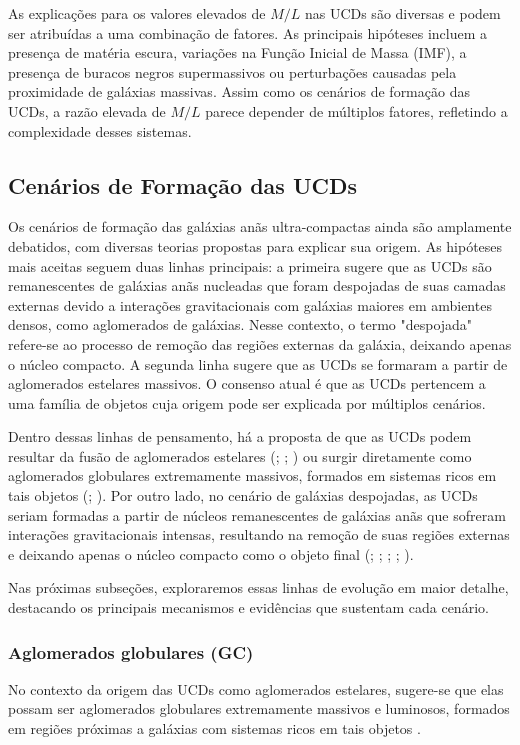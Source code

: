 As explicações para os valores elevados de $M/L$ nas UCDs são diversas e podem ser atribuídas a uma combinação de fatores. As principais hipóteses incluem a presença de matéria escura, variações na Função Inicial de Massa (IMF), a presença de buracos negros supermassivos ou perturbações causadas pela proximidade de galáxias massivas. Assim como os cenários de formação das UCDs, a razão elevada de $M/L$ parece depender de múltiplos fatores, refletindo a complexidade desses sistemas.

\subsection{Cenários de Formação das UCDs}\label{subsec:formacao}
Os cenários de formação das galáxias anãs ultra-compactas ainda são amplamente debatidos, com diversas teorias propostas para explicar sua origem. As hipóteses mais aceitas seguem duas linhas principais: a primeira sugere que as UCDs são remanescentes de galáxias anãs nucleadas que foram despojadas de suas camadas externas devido a interações gravitacionais com galáxias maiores em ambientes densos, como aglomerados de galáxias. Nesse contexto, o termo "despojada" refere-se ao processo de remoção das regiões externas da galáxia, deixando apenas o núcleo compacto. A segunda linha sugere que as UCDs se formaram a partir de aglomerados estelares massivos. O consenso atual é que as UCDs pertencem a uma família de objetos cuja origem pode ser explicada por múltiplos cenários.

Dentro dessas linhas de pensamento, há a proposta de que as UCDs podem resultar da fusão de aglomerados estelares (\citealp{Kroupa_1998}; \citealp{Fellhauer_2002}; \citealp{Br_ns_2012}) ou surgir diretamente como aglomerados globulares extremamente massivos, formados em sistemas ricos em tais objetos (\citealp{Mieske_2002}; \citealp{Mieske_2011}). Por outro lado, no cenário de galáxias despojadas, as UCDs seriam formadas a partir de núcleos remanescentes de galáxias anãs que sofreram interações gravitacionais intensas, resultando na remoção de suas regiões externas e deixando apenas o núcleo compacto como o objeto final (\citealp{Bassino_1994}; \citealp{Bekki_2001}; \citealp{Drinkwater_2003}; \citealp{Goerdt_2008}; \citealp{Pfeffer_2013}).

Nas próximas subseções, exploraremos essas linhas de evolução em maior detalhe, destacando os principais mecanismos e evidências que sustentam cada cenário.

\subsubsection{Aglomerados globulares (GC)}\label{subsubsec:}
No contexto da origem das UCDs como aglomerados estelares, sugere-se que elas possam ser aglomerados globulares extremamente massivos e luminosos, formados em regiões próximas a galáxias com sistemas ricos em tais objetos \citep{Mieske_2002}.

